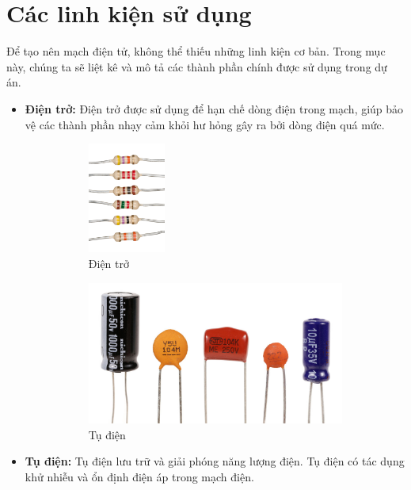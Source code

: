 \section{Các linh kiện sử dụng}
Để tạo nên mạch điện tử, không thể thiếu những linh kiện cơ bản. Trong mục này, chúng ta sẽ liệt kê và mô tả các thành phần chính được sử dụng trong dự án.

\begin{itemize}
    \item \textbf{Điện trở:} Điện trở được sử dụng để hạn chế dòng điện trong mạch, giúp bảo vệ các thành phần nhạy cảm khỏi hư hỏng gây ra bởi dòng điện quá mức.

    \begin{figure}[h!]
        \centering
        \begin{subfigure}{0.5\textwidth}
            \centering
            \includegraphics[width=0.3\textwidth]{graphics/section2/resistors.png}
            \caption*{Điện trở}
        \end{subfigure}
        \hfill
        \begin{subfigure}{0.45\textwidth}
            \centering
            \includegraphics[width=\textwidth]{graphics/section2/capacitors.png}
            \caption*{Tụ điện}
        \end{subfigure}
        \caption*{}
    \end{figure}
    \item \textbf{Tụ điện:} Tụ điện lưu trữ và giải phóng năng lượng điện. Tụ điện có tác dụng khử nhiễu và ổn định điện áp trong mạch điện.


\end{itemize}
